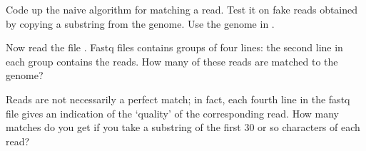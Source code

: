 \begin{exercise}
  \label{ex:readmatch}
  Code up the naive algorithm for matching a read. Test it on fake
  reads obtained by copying a substring from the
  genome. Use the genome in .

  Now read the  file
  . Fastq files contains groups of four
  lines: the second line in each group contains the reads.
  How many of these reads are matched to the genome?

  Reads are not necessarily a perfect match; in fact, each fourth line
  in the fastq file gives an indication of the `quality' of the
  corresponding read. How many matches do you get if you take a
  substring of the first 30 or so characters of each read?
\end{exercise}
